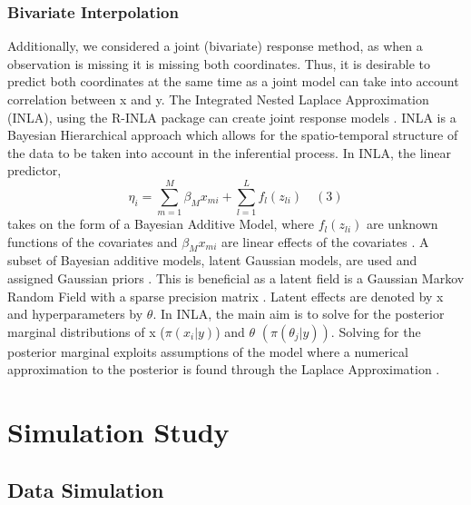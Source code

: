 \documentclass[12pt]{article}
\begin{document}
\hypertarget{bivariate-interpolation}{%
\subsubsection{Bivariate Interpolation}\label{bivariate-interpolation}}

Additionally, we considered a joint (bivariate) response method, as when
a observation is missing it is missing both coordinates. Thus, it is
desirable to predict both coordinates at the same time as a joint model
can take into account correlation between x and y. The Integrated Nested
Laplace Approximation (INLA), using the R-INLA package can create joint
response models \citep[\citet{rue_review_2017}]{rue_inla_2009}. INLA is
a Bayesian Hierarchical approach which allows for the spatio-temporal
structure of the data to be taken into account in the inferential
process. In INLA, the linear predictor,
\[\eta_{i} = \sum^{M}_{m=1}\beta_{M}x_{mi} + \sum^{L}_{l=1}f_{l}(z_{li}) \quad (3)\]
takes on the form of a Bayesian Additive Model, where \(f_{l}(z_{li})\)
are unknown functions of the covariates and \(\beta_{M}x_{mi}\) are
linear effects of the covariates \citep{BLANGIARDO201333}. A subset of
Bayesian additive models, latent Gaussian models, are used and assigned
Gaussian priors \citep{MORAGA2021100440}. This is beneficial as a latent
field is a Gaussian Markov Random Field with a sparse precision matrix
\citep{BLANGIARDO201333}. Latent effects are denoted by x and
hyperparameters by \(\theta\). In INLA, the main aim is to solve for the
posterior marginal distributions of x (\(\pi(x_i|y)\)) and \(\theta\)
\((\pi(\theta_j|y))\). Solving for the posterior marginal exploits
assumptions of the model where a numerical approximation to the
posterior is found through the Laplace Approximation
\citep{rue_inla_2009}.

\hypertarget{simulation}{%
\section{Simulation Study}\label{simulation}}

\hypertarget{data-simulation}{%
\subsection{Data Simulation}\label{data-simulation}}
\end{document}
